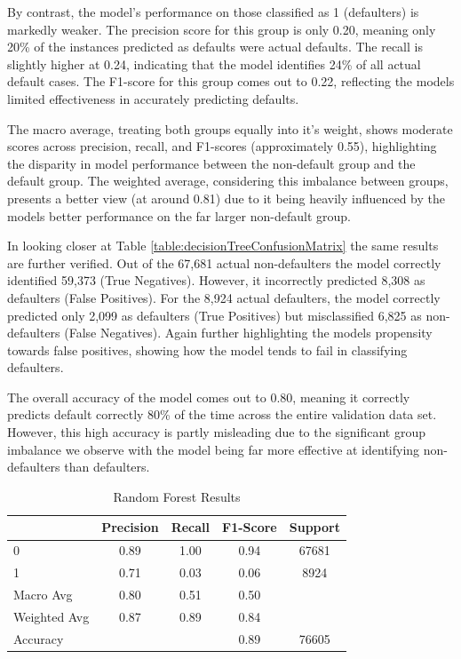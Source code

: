 \documentclass[12pt]{article}
\begin{document}
By contrast, the model's performance on those classified as 1 (defaulters) is markedly weaker. The precision score for this group is only 0.20, meaning only 20\% of the instances predicted as defaults were actual defaults. The recall is slightly higher at 0.24, indicating that the model identifies 24\% of all actual default cases. The F1-score for this group comes out to 0.22, reflecting the models limited effectiveness in accurately predicting defaults.

The macro average, treating both groups equally into it's weight, shows moderate scores across precision, recall, and F1-scores (approximately 0.55), highlighting the disparity in model performance between the non-default group and the default group. The weighted average, considering this imbalance between groups, presents a better view (at around 0.81) due to it being heavily influenced by the models better performance on the far larger non-default group.

In looking closer at Table \ref{table:decisionTreeConfusionMatrix} the same results are further verified. Out of the 67,681 actual non-defaulters the model correctly identified 59,373 (True Negatives). However, it incorrectly predicted 8,308 as defaulters (False Positives). For the 8,924 actual defaulters, the model correctly predicted only 2,099 as defaulters (True Positives) but misclassified 6,825 as non-defaulters (False Negatives). Again further highlighting the models propensity towards false positives, showing how the model tends to fail in classifying defaulters.

The overall accuracy of the model comes out to 0.80, meaning it correctly predicts default correctly 80\% of the time across the entire validation data set. However, this high accuracy is partly misleading due to the significant group imbalance we observe with the model being far more effective at identifying non-defaulters than defaulters.

\begin{table}[htbp]
    \centering
    \caption{Random Forest Results}
    \begin{tabular}{lcccc}
        \toprule
        & Precision & Recall & F1-Score & Support \\
        \midrule
        0 & 0.89 & 1.00 & 0.94 & 67681 \\
        1 & 0.71 & 0.03 & 0.06 & 8924 \\
        Macro Avg & 0.80 & 0.51 & 0.50 & \\
        Weighted Avg & 0.87 & 0.89 & 0.84 & \\
        \midrule
        Accuracy & & & 0.89 & 76605 \\
        \bottomrule
    \end{tabular}
    \label{table:randomForestResults}
\end{table}
\end{document}
